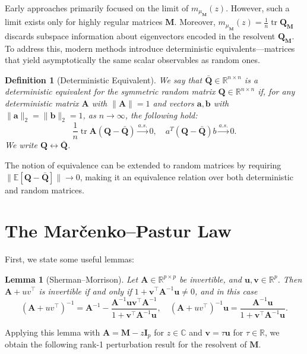 \documentclass[12pt]{article}
\newtheorem{lemma}{Lemma}
\newtheorem{definition}{Definition}
\DeclareMathOperator{\tr}{tr}
\begin{document}
Early approaches primarily focused on the limit of $m_{\mu_\mathbf{M}}(z)$. However, such a limit exists only for highly regular matrices $\mathbf{M}$. Moreover, $m_{\mu_\mathbf{M}}(z) = \frac{1}{n} \tr \mathbf{Q}_\mathbf{M}$ discards subspace information about eigenvectors encoded in the resolvent $\mathbf{Q}_\mathbf{M}$. To address this, modern methods introduce deterministic equivalents---matrices that yield asymptotically the same scalar observables as random ones.
\begin{definition}[Deterministic Equivalent]\label{lem:deterministic-equivalent}
We say that $\bar{\mathbf{Q}} \in \mathbb{R}^{n \times n}$ is a deterministic equivalent for the symmetric random matrix $\mathbf{Q} \in \mathbb{R}^{n \times n}$ if, for any deterministic matrix $\mathbf{A}$ with $\|\mathbf{A}\| = 1$ and vectors $\mathbf{a}, \mathbf{b}$ with $\|\mathbf{a}\|_2 = \|\mathbf{b}\|_2 = 1$, as $n \to \infty$, the following hold:
$$ \frac{1}{n} \tr \mathbf{A}(\mathbf{Q} - \bar{\mathbf{Q}}) \xrightarrow{a.s.} 0, \quad a^T(\mathbf{Q} - \bar{\mathbf{Q}})b \xrightarrow{a.s.} 0. $$
We write $\mathbf{Q} \leftrightarrow \bar{\mathbf{Q}}$.
\end{definition}
The notion of equivalence can be extended to random matrices by requiring $\lVert \mathbb{E}[\mathbf{Q} - \bar{\mathbf{Q}}] \rVert \to 0$, making it an equivalence relation over both deterministic and random matrices.

\section{The Mar\v{c}enko--Pastur Law}
First, we state some useful lemmas:
\begin{lemma}[Sherman--Morrison]\label{lem:sherman-morrison}
Let $\mathbf{A} \in \mathbb{R}^{p \times p}$ be invertible, and $\mathbf{u}, \mathbf{v} \in \mathbb{R}^p$. Then $\mathbf{A} + uv^\top$ is invertible if and only if $1 + \mathbf{v}^\top \mathbf{A}^{-1} \mathbf{u} \neq 0$, and in this case
$$
(\mathbf{A} + uv^\top)^{-1} = \mathbf{A}^{-1} - \frac{\mathbf{A}^{-1} \mathbf{u} \mathbf{v}^\top \mathbf{A}^{-1}}{1 + \mathbf{v}^\top \mathbf{A}^{-1} \mathbf{u}}, \quad
(\mathbf{A} + uv^\top)^{-1} \mathbf{u} = \frac{\mathbf{A}^{-1} \mathbf{u}}{1 + \mathbf{v}^\top \mathbf{A}^{-1} \mathbf{u}}.
$$
\end{lemma}

Applying this lemma with $\mathbf{A} = \mathbf{M} - z \mathbf{I}_p$ for $z \in \mathbb{C}$ and $\mathbf{v} = \tau \mathbf{u}$ for $\tau \in \mathbb{R}$, we obtain the following rank-1 perturbation result for the resolvent of $\mathbf{M}$.
\end{document}
